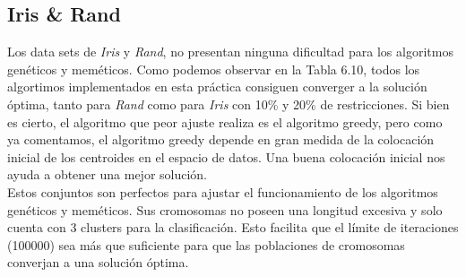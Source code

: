 \subsection{Iris \& Rand}
Los data sets de \emph{Iris} y \emph{Rand}, no presentan ninguna dificultad para los algoritmos genéticos y meméticos. Como podemos observar en la Tabla 6.10, todos los algortimos implementados en esta práctica consiguen converger a la solución óptima, tanto para \emph{Rand} como para \emph{Iris} con 10\% y 20\% de restricciones. Si bien es cierto, el algoritmo que peor ajuste realiza es el algoritmo greedy, pero como ya comentamos, el algoritmo greedy depende en gran medida de la colocación inicial de los centroides en el espacio de datos. Una buena colocación inicial nos ayuda a obtener una mejor solución.
\\
Estos conjuntos son perfectos para ajustar el funcionamiento de los algoritmos genéticos y meméticos. Sus cromosomas no poseen una longitud excesiva y solo cuenta con 3 clusters para la clasificación. Esto facilita que el límite de iteraciones (100000) sea más que suficiente para que las poblaciones de cromosomas converjan a una solución óptima.

